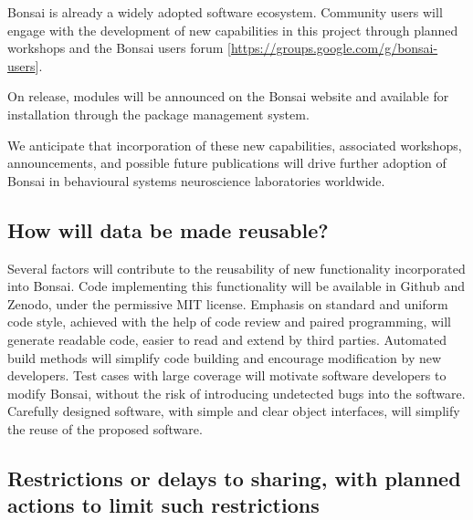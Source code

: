 \documentclass[a4paper,11pt]{article}
\begin{document}
Bonsai is already a widely adopted software ecosystem.  Community users will engage with the development of new capabilities in this project through planned workshops and the Bonsai users forum [\url{https://groups.google.com/g/bonsai-users}]. 

On release, modules will be announced on the Bonsai website and available for installation through the package management system.

We anticipate that incorporation of these new capabilities, associated workshops, announcements, and possible future publications will drive further adoption of Bonsai in behavioural systems neuroscience laboratories worldwide.

\subsection{How will data be made reusable?}


Several factors will contribute to the reusability of new functionality
incorporated into Bonsai. Code implementing this functionality will be
available in Github and Zenodo, under the permissive MIT license. Emphasis on standard and
uniform code style, achieved with the help of code review and paired
programming, will generate readable code, easier to read and extend by third
parties. Automated build methods will simplify code building and encourage
modification by new developers. Test cases with large coverage will motivate
software developers to modify Bonsai, without the risk of introducing
undetected bugs into the software. Carefully designed software, with simple and
clear object interfaces, will simplify the reuse of the proposed software.

\subsection{Restrictions or delays to sharing, with planned actions to limit such restrictions} 
\end{document}
